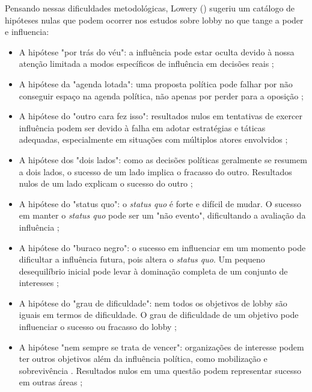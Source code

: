 Pensando nessas dificuldades metodológicas, Lowery (\citeyear{lowery_lobbying_2013}) sugeriu um catálogo de hipóteses nulas que podem ocorrer nos estudos sobre lobby no que tange a poder e influencia:
\begin{itemize}
    \item A hipótese "por trás do véu": a influência pode estar oculta devido à nossa atenção limitada a modos específicos de influência em decisões reais \cite{bachrach1962two, schattschneider1975semisovereign};
    \item A hipótese da "agenda lotada": uma proposta política pode falhar por não conseguir espaço na agenda política, não apenas por perder para a oposição \cite{baumgartner2010agendas, keim1988efficacy};
    \item A hipótese do "outro cara fez isso": resultados nulos em tentativas de exercer influência podem ser devido à falha em adotar estratégias e táticas adequadas, especialmente em situações com múltiplos atores envolvidos \cite{kollman1998outside, beyers2013policy, marshall2010lobby, binderkrantz2012customizing};
    \item A hipótese dos "dois lados": como as decisões políticas geralmente se resumem a dois lados, o sucesso de um lado implica o fracasso do outro. Resultados nulos de um lado explicam o sucesso do outro \cite{heinz1993hollow, baumgartner2009lobbying, mahoney2008brussels};
    \item A hipótese do "status quo": o \textit{status quo} é forte e difícil de mudar. O sucesso em manter o \textit{status quo} pode ser um "não evento", dificultando a avaliação da influência \cite{baumgartner2009lobbying};
    \item A hipótese do "buraco negro": o sucesso em influenciar em um momento pode dificultar a influência futura, pois altera o \textit{status quo}. Um pequeno desequilíbrio inicial pode levar à dominação completa de um conjunto de interesses \cite{anderson2004mayflies, berkhout2011short};
    \item A hipótese do "grau de dificuldade": nem todos os objetivos de lobby são iguais em termos de dificuldade. O grau de dificuldade de um objetivo pode influenciar o sucesso ou fracasso do lobby \cite{clarkterry1968community};
    \item A hipótese "nem sempre se trata de vencer": organizações de interesse podem ter outros objetivos além da influência política, como mobilização e sobrevivência \cite{grote2003europeanization, lowery2007organized}. Resultados nulos em uma questão podem representar sucesso em outras áreas \cite{pfeffer2015external};

\end{itemize}
